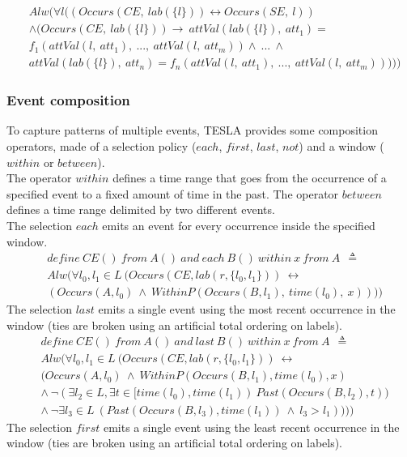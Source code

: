\begin{align*}
&Alw(\forall l ((Occurs(CE,\ lab(\{l\})) \leftrightarrow Occurs(SE,\ l))\\
&\wedge (Occurs(CE,\ lab(\{l\})) \rightarrow\ attVal(lab(\{l\}),\ att_1) =\\
&f_1(attVal(l,\ att_1),\ ...,\ attVal(l,\ att_m)) \wedge\ ...\ \wedge\\
&attVal(lab(\{l\}),\ att_n) = f_n(attVal(l,\ att_1),\ ...,\ attVal(l,\ att_m)))))
\end{align*}

\subsubsection{Event composition}
To capture patterns of multiple events, TESLA provides some composition operators, made of a selection policy ($each$, $first$, $last$, $not$) and a window ($within$ or $between$).\\
The operator $within$ defines a time range that goes from the occurrence of a specified event to a fixed amount of time in the past. The operator $between$ defines a time range delimited by two different events.\\
The selection $each$ emits an event for every occurrence inside the specified window.
\begin{align*}
&define\ CE()\ from\ A()\ and\ each\ B()\ within\ x\ from\ A\ \ \triangleq\\
&Alw(\forall l_0, l_1 \in L\ (Occurs(CE, lab(r, \{l_0, l_1\}))\ \leftrightarrow\\
&(Occurs(A, l_0)\ \wedge\ WithinP(Occurs(B, l_1),\ time(l_0),\ x))))
\end{align*}
The selection $last$ emits a single event using the most recent occurrence in the window (ties are broken using an artificial total ordering on labels).
\begin{align*}
&define\ CE()\ from\ A()\ and\ last\ B()\ within\ x\ from\ A\ \ \triangleq\\
&Alw(\forall l_0, l_1 \in L\ (Occurs(CE, lab(r, \{l_0, l_1\}))\ \leftrightarrow\\
&(Occurs(A, l_0)\ \wedge\ WithinP(Occurs(B, l_1),time(l_0),x)\\
&\wedge\ \neg (\exists l_2 \in L, \exists t\in [time(l_0), time(l_1))\ Past(Occurs(B, l_2),t))\\
&\wedge\ \neg \exists l_3 \in L\ (Past(Occurs(B, l_3), time(l_1))\ \wedge\ l_3 > l_1)))) 
\end{align*}
The selection $first$ emits a single event using the least recent occurrence in the window (ties are broken using an artificial total ordering on labels).
